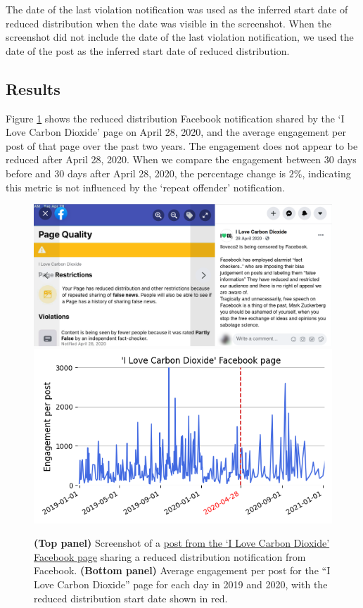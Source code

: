 \documentclass[11pt,a4paper]{article}
\begin{document}
The date of the last violation notification was used as the inferred start date of reduced distribution when the date was visible in the screenshot. 
When the screenshot did not include the date of the last violation notification, we used the date of the post as the inferred start date of reduced distribution. 

\subsection{Results}

Figure \ref{reduce_example} shows the reduced distribution Facebook notification shared by the ‘I Love Carbon Dioxide’ page on April 28, 2020, and the average engagement per post of that page over the past two years. 
The engagement does not appear to be reduced after April 28, 2020. 
When we compare the engagement between 30 days before and 30 days after April 28, 2020, the percentage change is $2\%$, indicating this metric is not influenced by the `repeat offender' notification.

\begin{figure}[!h]
\centering
\includegraphics[width=\linewidth]{./../figure/reduce_example_screenshot.png}
\includegraphics[width=\linewidth]{./../figure/reduce_example_timeseries.png}
\caption{{\bf(Top panel)} Screenshot of a \href{https://archive.is/ie4dR}{post from the `I Love Carbon Dioxide' Facebook page} sharing a reduced distribution notification from Facebook. {\bf(Bottom panel)} Average engagement per post for the “I Love Carbon Dioxide” page for each day in 2019 and 2020, with the reduced distribution start date shown in red.}
\label{reduce_example}
\end{figure}
\end{document}
